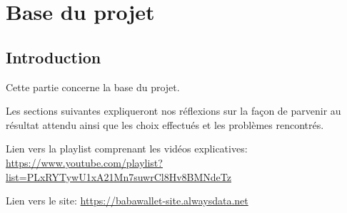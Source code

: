 \section{Base du projet}
\subsection{Introduction}
\begin{flushleft}
Cette partie concerne la base du projet.
\end{flushleft}
\begin{flushleft}
Les sections suivantes expliqueront nos réflexions sur la façon de parvenir au résultat attendu ainsi que les choix effectués et les problèmes rencontrés.
\end{flushleft}
\begin{flushleft}
Lien vers la playlist comprenant les vidéos explicatives:
\href{https://www.youtube.com/playlist?list=PLxRYTywU1xA21Mn7suwrCl8Hv8BMNdeTz}{https://www.youtube.com/playlist?list=PLxRYTywU1xA21Mn7suwrCl8Hv8BMNdeTz}
\end{flushleft}

\begin{flushleft}
Lien vers le site:
\href{https://babawallet-site.alwaysdata.net}{https://babawallet-site.alwaysdata.net}
\end{flushleft}